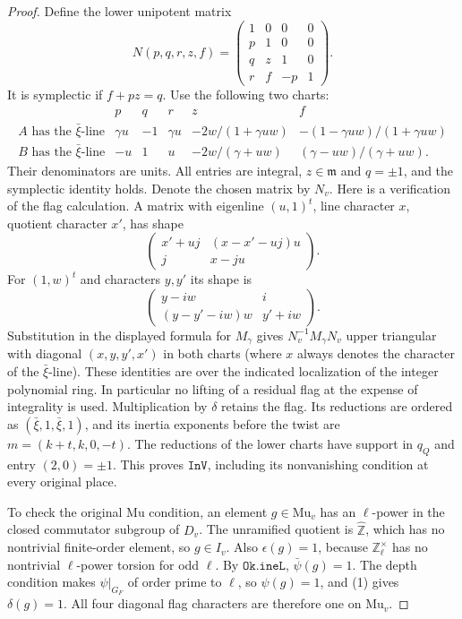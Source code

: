 \begin{proof}
Define the lower unipotent matrix
\[
 N(p,q,r,z,f)=
 \begin{pmatrix}1&0&0&0\\p&1&0&0\\q&z&1&0\\r&f&-p&1\end{pmatrix}.
\]
It is symplectic if \(f+pz=q\). Use the following two charts:
\[
\begin{array}{c|ccccc}
 &p&q&r&z&f\\ \hline
 A\text{ has the }\bar\xi\text{-line}
 &\gamma u&-1&\gamma u&
 -2w/(1+\gamma uw)&-(1-\gamma uw)/(1+\gamma uw)\\
 B\text{ has the }\bar\xi\text{-line}
 &-u&1&u&-2w/(\gamma+uw)&(\gamma-uw)/(\gamma+uw).
\end{array}
\]
Their denominators are units. All entries are integral,
\(z\in\mathfrak m\) and \(q=\pm1\), and the symplectic identity
holds. Denote the chosen matrix by \(N_v\).
Here is a verification of the flag calculation. A matrix with
eigenline \((u,1)^t\), line character \(x\), quotient character
\(x'\), has shape
\[
 \begin{pmatrix}x'+u j&(x-x'-u j)u\\j&x-ju\end{pmatrix}.
\]
For \((1,w)^t\) and characters \(y,y'\) its shape is
\[
 \begin{pmatrix}y-iw&i\\(y-y'-iw)w&y'+iw\end{pmatrix}.
\]
Substitution in the displayed formula for \(M_\gamma\)
gives \(N_v^{-1}M_\gamma N_v\) upper triangular with diagonal
\((x,y,y',x')\) in both charts (where \(x\) always denotes
the character of the \(\bar\xi\)-line).
These identities are over the indicated localization of the
integer polynomial ring. In particular no lifting of a residual
flag at the expense of integrality is used. Multiplication by
\(\delta\) retains the flag. Its reductions are ordered as
\((\bar\xi,1,\bar\xi,1)\), and its inertia exponents before the
twist are \(m=(k+t,k,0,-t)\).
The reductions of the lower charts have support in \(q_Q\)
and entry \((2,0)=\pm1\). This proves \(\texttt{InV}\), including
its nonvanishing condition at every original place.

To check the original \(\mathrm{Mu}\) condition, an element
\(g\in\mathrm{Mu}_v\) has an \(\ell\)-power in the closed
commutator subgroup of \(D_v\). The unramified quotient is
\(\widehat{\mathbb Z}\), which has no nontrivial finite-order
element, so \(g\in I_v\). Also \(\epsilon(g)=1\), because
\(\mathbb Z_\ell^\times\) has no nontrivial \(\ell\)-power torsion
for odd \(\ell\). By \(\texttt{Ok.ineL}\), \(\bar\psi(g)=1\).
The depth condition makes \(\psi|_{G_F}\) of order prime to
\(\ell\), so \(\psi(g)=1\), and (1) gives \(\delta(g)=1\).
All four diagonal flag characters are therefore one on
\(\mathrm{Mu}_v\).


\end{proof}
